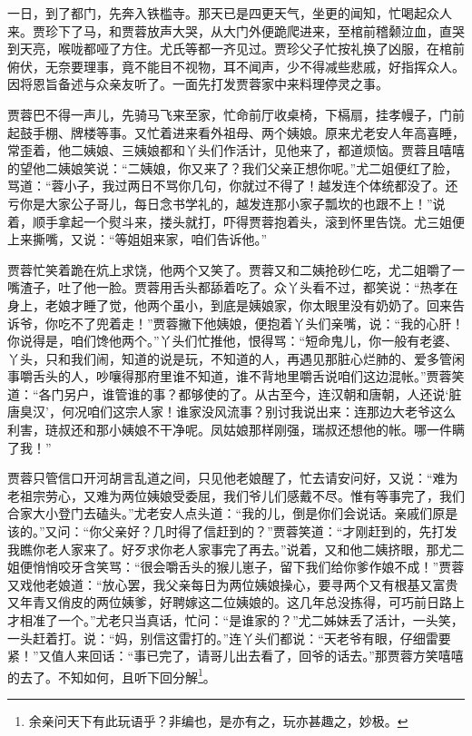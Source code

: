 \documentclass[12pt,oneside]{book}
\begin{document}
一日，到了都门，先奔入铁槛寺。那天已是四更天气，坐更的闻知，忙喝起众人来。贾珍下了马，和贾蓉放声大哭，从大门外便跪爬进来，至棺前稽颡泣血，直哭到天亮，喉咙都哑了方住。尤氏等都一齐见过。贾珍父子忙按礼换了凶服，在棺前俯伏，无奈要理事，竟不能目不视物，耳不闻声，少不得减些悲戚，好指挥众人。因将恩旨备述与众亲友听了。一面先打发贾蓉家中来料理停灵之事。

贾蓉巴不得一声儿，先骑马飞来至家，忙命前厅收桌椅，下槅扇，挂孝幔子，门前起鼓手棚、牌楼等事。又忙着进来看外祖母、两个姨娘。原来尤老安人年高喜睡，常歪着，他二姨娘、三姨娘都和丫头们作活计，见他来了，都道烦恼。贾蓉且嘻嘻的望他二姨娘笑说：“二姨娘，你又来了？我们父亲正想你呢。”尤二姐便红了脸，骂道：“蓉小子，我过两日不骂你几句，你就过不得了！越发连个体统都没了。还亏你是大家公子哥儿，每日念书学礼的，越发连那小家子瓢坎的也跟不上！”说着，顺手拿起一个熨斗来，搂头就打，吓得贾蓉抱着头，滚到怀里告饶。尤三姐便上来撕嘴，又说：“等姐姐来家，咱们告诉他。”

贾蓉忙笑着跪在炕上求饶，他两个又笑了。贾蓉又和二姨抢砂仁吃，尤二姐嚼了一嘴渣子，吐了他一脸。贾蓉用舌头都舔着吃了。众丫头看不过，都笑说：“热孝在身上，老娘才睡了觉，他两个虽小，到底是姨娘家，你太眼里没有奶奶了。回来告诉爷，你吃不了兜着走！”贾蓉撇下他姨娘，便抱着丫头们亲嘴，说：“我的心肝！你说得是，咱们馋他两个。”丫头们忙推他，恨得骂：“短命鬼儿，你一般有老婆、丫头，只和我们闹，知道的说是玩，不知道的人，再遇见那脏心烂肺的、爱多管闲事嚼舌头的人，吵嚷得那府里谁不知道，谁不背地里嚼舌说咱们这边混帐。”贾蓉笑道：“各门另户，谁管谁的事？都够使的了。从古至今，连汉朝和唐朝，人还说‘脏唐臭汉’，何况咱们这宗人家！谁家没风流事？别讨我说出来：连那边大老爷这么利害，琏叔还和那小姨娘不干净呢。凤姑娘那样刚强，瑞叔还想他的帐。哪一件瞒了我！”

贾蓉只管信口开河胡言乱道之间，只见他老娘醒了，忙去请安问好，又说：“难为老祖宗劳心，又难为两位姨娘受委屈，我们爷儿们感戴不尽。惟有等事完了，我们合家大小登门去磕头。”尤老安人点头道：“我的儿，倒是你们会说话。亲戚们原是该的。”又问：“你父亲好？几时得了信赶到的？”贾蓉笑道：“才刚赶到的，先打发我瞧你老人家来了。好歹求你老人家事完了再去。”说着，又和他二姨挤眼，那尤二姐便悄悄咬牙含笑骂：“很会嚼舌头的猴儿崽子，留下我们给你爹作娘不成！”贾蓉又戏他老娘道：“放心罢，我父亲每日为两位姨娘操心，要寻两个又有根基又富贵又年青又俏皮的两位姨爹，好聘嫁这二位姨娘的。这几年总没拣得，可巧前日路上才相准了一个。”尤老只当真话，忙问：“是谁家的？”尤二姊妹丢了活计，一头笑，一头赶着打。说：“妈，别信这雷打的。”连丫头们都说：“天老爷有眼，仔细雷要紧！”又值人来回话：“事已完了，请哥儿出去看了，回爷的话去。”那贾蓉方笑嘻嘻的去了。不知如何，且听下回分解\footnote{余亲问天下有此玩语乎？非编也，是亦有之，玩亦甚趣之，妙极。}。
\end{document}
